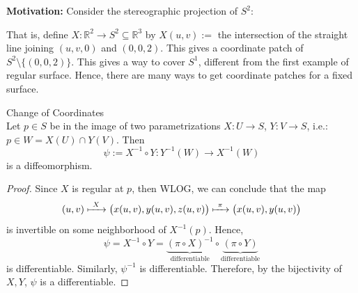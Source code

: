 \noindent\textbf{Motivation:} Consider the stereographic projection of $S^2$: 
\begin{center}
\end{center}
That is, define $X: \mathbb{R}^2 \to S^2 \subseteq \mathbb{R}^3$ by $X(u,v) :=$ the intersection of the straight line joining $(u,v,0)$ and $(0,0,2)$. This gives a coordinate patch of $S^2 \setminus \{ (0,0,2)\}$. This gives a way to cover $S^1$, different from the first example of regular surface. Hence, there are many ways to get coordinate patches for a fixed surface.

\begin{proposition}{Change of Coordinates}\\
Let $p\in S$ be in the image of two parametrizations $X: U\to S$, $Y: V\to S$, i.e.: $p\in W = X(U)\cap Y(V)$. Then
\[
\psi := X^{-1}\circ Y: Y^{-1}(W)\longrightarrow X^{-1}(W)
\]
is a diffeomorphism.
\end{proposition}

\begin{proof}
Since $X$ is regular at $p$, then WLOG, we can conclude that the map
\[
(u, v)\xmapsto{\ X\ }\big(x(u,v), y(u,v), z(u,v)\big)\xmapsto{\ \pi\ }\big(x(u,v), y(u,v)\big)
\]
is invertible on some neighborhood of $X^{-1}(p)$. Hence,
\[
\psi = X^{-1}\circ Y = \underbrace{(\pi\circ X)^{-1}}_{\text{differentiable}}\circ\underbrace{(\pi\circ Y)}_{\text{differentiable}}
\]
is differentiable. Similarly, $\psi^{-1}$ is differentiable. Therefore, by the bijectivity of $X, Y$, $\psi$ is a differentiable. 
\end{proof}


